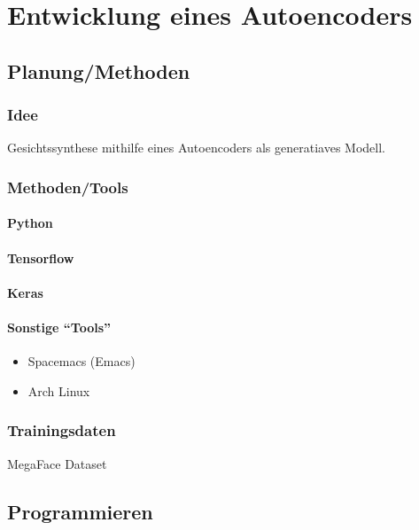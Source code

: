 \documentclass[../main]{subfiles}
\begin{document}
\section{Entwicklung eines Autoencoders}

\subsection{Planung/Methoden}

\subsubsection{Idee}
Gesichtssynthese mithilfe eines Autoencoders als generatiaves Modell.

\subsubsection{Methoden/Tools}

\paragraph{Python}
\paragraph{Tensorflow}
\paragraph{Keras}
\paragraph{Sonstige ``Tools''}
\begin{itemize}
\item{Spacemacs (Emacs)}
\item{Arch Linux}
\end{itemize}

\subsubsection{Trainingsdaten}
MegaFace Dataset

\subsection{Programmieren}
\end{document}
